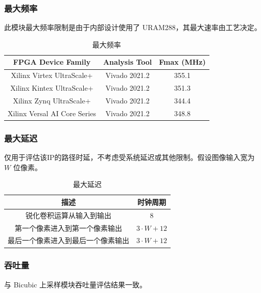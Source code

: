 \documentclass[12pt, a4paper, oneside]{ctexbook}
\begin{document}
	\subsubsection{最大频率}
	此模块最大频率限制是由于内部设计使用了 URAM288，其最大速率由工艺决定。
	\begin{table}[h]
		\centering
		\begin{tabular}{|c|c|c|}
			\hline
			\textbf{FPGA Device Family}  & \textbf{Analysis Tool} & \textbf{Fmax (MHz)} \\ \hline
			Xilinx Virtex UltraScale+    & Vivado 2021.2          & 355.1               \\ \hline
			Xilinx Kintex UltraScale+    & Vivado 2021.2          & 351.3               \\ \hline
			Xilinx Zynq UltraScale+      & Vivado 2021.2          & 344.4               \\ \hline
			Xilinx Versal AI Core Series & Vivado 2021.2          & 348.8               \\ \hline
		\end{tabular}
		\caption{最大频率}
	\end{table}	
	\newpage
	\subsubsection{最大延迟}
	仅用于评估该IP的路径时延，不考虑受系统延迟或其他限制。假设图像输入宽为 $W$ 位像素。
	\begin{table}[htb]
		\centering
		\begin{tabular}{|c|c|}
			\hline
			\textbf{描述}       			& \textbf{时钟周期}  			\\ \hline
			锐化卷积运算从输入到输出      	& 8                            \\ \hline
			第一个像素进入到第一个像素输出   & $3\cdot W+12$                \\ \hline
			最后一个像素进入到最后一个像素输出 & $3\cdot W + 12$            \\ \hline
		\end{tabular}
		\caption{最大延迟}
	\end{table}
	\subsubsection{吞吐量}
	与 Bicubic 上采样模块吞吐量评估结果一致。
\end{document}
